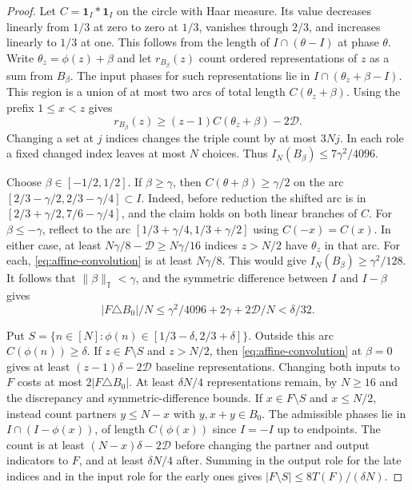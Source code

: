 \documentclass[11pt,reqno]{amsart}
\newcommand{\T}{\mathbb T}
\newcommand{\ind}{\mathbf 1}
\numberwithin{equation}{section}
\begin{document}
\begin{proof}
Let \(C=\ind_I*\ind_I\) on the circle with Haar measure.
Its value decreases linearly from \(1/3\) at zero to zero at
\(1/3\), vanishes through \(2/3\), and increases linearly to
\(1/3\) at one. This follows from the length of \(I\cap(\theta-I)\)
at phase \(\theta\).
Write \(\theta_z=\phi(z)+\beta\) and let \(r_{B_\beta}(z)\)
count ordered representations of \(z\) as a sum from \(B_\beta\).
The input phases for such representations lie in
\(I\cap(\theta_z+\beta-I)\). This region is a union of at most
two arcs of total length \(C(\theta_z+\beta)\).
Using the prefix \(1\le x<z\) gives
\begin{equation}\label{eq:affine-convolution}
 r_{B_\beta}(z)\ge (z-1)C(\theta_z+\beta)-2\mathcal D .
\end{equation}
Changing a set at \(j\) indices changes the triple count by
at most \(3Nj\). In each role a fixed changed index leaves at
most \(N\) choices. Thus \(I_N(B_\beta)\le7\gamma^2/4096\).

Choose \(\beta\in[-1/2,1/2]\). If \(\beta\ge\gamma\),
then \(C(\theta+\beta)\ge\gamma/2\) on the arc
\([2/3-\gamma/2,2/3-\gamma/4]\subset I\).
Indeed, before reduction the shifted arc is in
\([2/3+\gamma/2,7/6-\gamma/4]\), and the claim holds on both
linear branches of \(C\). For \(\beta\le-\gamma\), reflect to
the arc \([1/3+\gamma/4,1/3+\gamma/2]\) using \(C(-x)=C(x)\).
In either case, at least \(N\gamma/8-\mathcal D\ge N\gamma/16\)
indices \(z>N/2\) have \(\theta_z\) in that arc. For each,
\eqref{eq:affine-convolution} is at least \(N\gamma/8\).
This would give \(I_N(B_\beta)\ge\gamma^2/128\).
It follows that \(\|\beta\|_\T<\gamma\), and the symmetric
difference between \(I\) and \(I-\beta\) gives
\[
 |F\triangle B_0|/N\le\gamma^2/4096+2\gamma+2\mathcal D/N
 <\delta/32.
\]

Put \(S=\{n\in[N]:\phi(n)\in[1/3-\delta,2/3+\delta]\}\).
Outside this arc \(C(\phi(n))\ge\delta\).
If \(z\in F\setminus S\) and \(z>N/2\), then
\eqref{eq:affine-convolution} at \(\beta=0\) gives at least
\((z-1)\delta-2\mathcal D\) baseline representations.
Changing both inputs to \(F\) costs at most \(2|F\triangle B_0|\).
At least \(\delta N/4\) representations remain, by \(N\ge16\)
and the discrepancy and symmetric-difference bounds.
If \(x\in F\setminus S\) and \(x\le N/2\), instead count
partners \(y\le N-x\) with \(y,x+y\in B_0\). The admissible
phases lie in \(I\cap(I-\phi(x))\), of length \(C(\phi(x))\)
since \(I=-I\) up to endpoints. The count is at least
\((N-x)\delta-2\mathcal D\) before changing the partner and
output indicators to \(F\), and at least \(\delta N/4\) after.
Summing in the output role for the late indices and in the
input role for the early ones gives \(|F\setminus S|\le8T(F)/(\delta N)\).


\end{proof}
\end{document}
